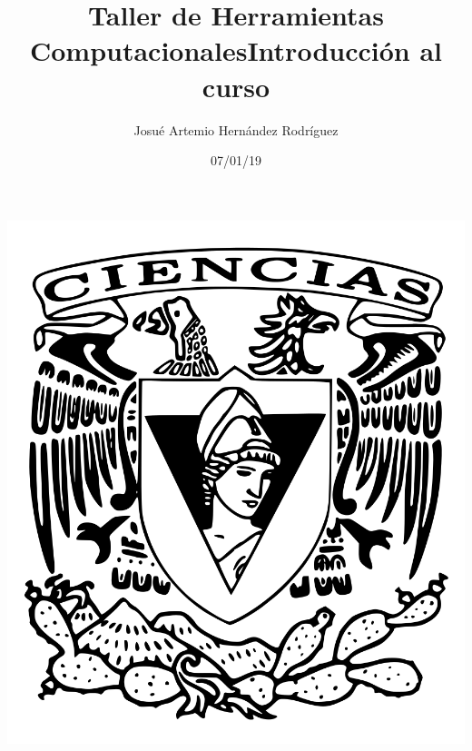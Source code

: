\documentclass[letterpaper, 12pt, oneside]{article}%
\title{\Huge Taller de Herramientas Computacionales}
\author{Josué Artemio Hernández Rodríguez}%
\date{07/01/19}%
\begin{document}
\maketitle
\begin{center}%
\includegraphics[scale=0.2]{2.png}%
\end{center}%
\newpage%

\title{\Huge Introducción al curso\\}%
\end{document}
